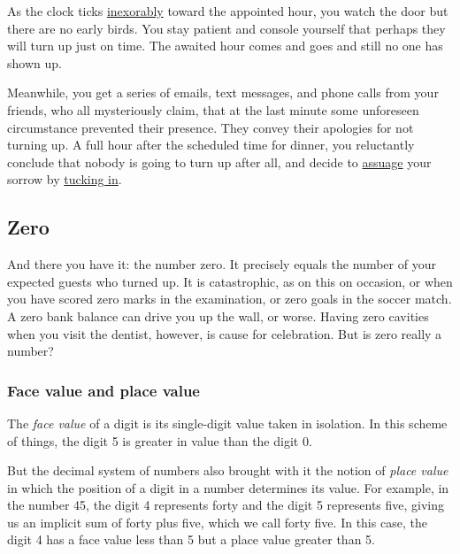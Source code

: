 \documentclass[
  a4paper,
]{article}
\begin{document}
As the clock ticks
\href{https://www.thefreedictionary.com/inexorably}{inexorably} toward
the appointed hour, you watch the door but there are no early birds. You
stay patient and console yourself that perhaps they will turn up just on
time. The awaited hour comes and goes and still no one has shown up.

Meanwhile, you get a series of emails, text messages, and phone calls
from your friends, who all mysteriously claim, that at the last minute
some unforeseen circumstance prevented their presence. They convey their
apologies for not turning up. A full hour after the scheduled time for
dinner, you reluctantly conclude that nobody is going to turn up after
all, and decide to
\href{https://www.merriam-webster.com/dictionary/assuage}{assuage} your
sorrow by
\href{https://www.oxfordlearnersdictionaries.com/definition/english/tuck-in}{tucking
in}.

\hypertarget{zero}{%
\subsection{Zero}\label{zero}}

And there you have it: the number zero. It precisely equals the number
of your expected guests who turned up. It is catastrophic, as on this on
occasion, or when you have scored zero marks in the examination, or zero
goals in the soccer match. A zero bank balance can drive you up the
wall, or worse. Having zero cavities when you visit the dentist,
however, is cause for celebration. But is zero really a number?

\hypertarget{face-value-and-place-value}{%
\subsubsection{Face value and place
value}\label{face-value-and-place-value}}

The \emph{face value} of a digit is its single-digit value taken in
isolation. In this scheme of things, the digit 5 is greater in value
than the digit 0.

But the decimal system of numbers also brought with it the notion of
\emph{place value} in which the position of a digit in a number
determines its value. For example, in the number 45, the digit 4
represents forty and the digit 5 represents five, giving us an implicit
sum of forty plus five, which we call forty five. In this case, the
digit 4 has a face value less than 5 but a place value greater than 5.
\end{document}
